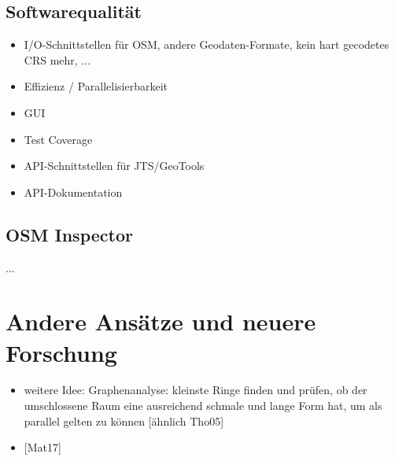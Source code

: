 \documentclass[../main/thesis.tex]{subfiles}
\begin{document}
\subsection{Softwarequalität}

\begin{itemize}
\item I/O-Schnittstellen für OSM, andere Geodaten-Formate, kein hart gecodetes CRS mehr, ...
\item Effizienz / Parallelisierbarkeit
\item GUI
\item Test Coverage
\item API-Schnittstellen für JTS/GeoTools
\item API-Dokumentation
\end{itemize}




\subsection{OSM Inspector}

...



\section{Andere Ansätze und neuere Forschung}

\begin{itemize}
\item weitere Idee: Graphenanalyse: kleinste Ringe finden und prüfen, ob der umschlossene Raum eine ausreichend schmale und lange Form hat, um als parallel gelten zu können [ähnlich Tho05]
\item {[Mat17]}
\end{itemize}




\end{document}
